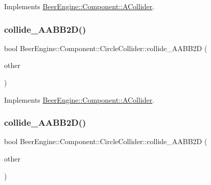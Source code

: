 Implements \mbox{\hyperlink{class_beer_engine_1_1_component_1_1_a_collider_ad9367c0e75c941509322fb984d16de00}{Beer\+Engine\+::\+Component\+::\+A\+Collider}}.

\mbox{\label{class_beer_engine_1_1_component_1_1_circle_collider_a20e45eaf7bb9ca22573e0fda117ae274}} 
\subsubsection{\texorpdfstring{collide\+\_\+\+A\+A\+B\+B2\+D()}{collide\_AABB2D()}\hspace{0.1cm}{\footnotesize\ttfamily [1/2]}}
{\footnotesize\ttfamily bool Beer\+Engine\+::\+Component\+::\+Circle\+Collider\+::collide\+\_\+\+A\+A\+B\+B2D (\begin{DoxyParamCaption}\item[{\mbox{\hyperlink{class_beer_engine_1_1_component_1_1_circle_collider}{Circle\+Collider}} $\ast$}]{other }\end{DoxyParamCaption})\hspace{0.3cm}{\ttfamily [virtual]}}



Implements \mbox{\hyperlink{class_beer_engine_1_1_component_1_1_a_collider_ab9acc12bf6017b81f3515264238ce3d5}{Beer\+Engine\+::\+Component\+::\+A\+Collider}}.

\mbox{\label{class_beer_engine_1_1_component_1_1_circle_collider_a9e88d5908734005d0141a75b8b02fd78}} 
\subsubsection{\texorpdfstring{collide\+\_\+\+A\+A\+B\+B2\+D()}{collide\_AABB2D()}\hspace{0.1cm}{\footnotesize\ttfamily [2/2]}}
{\footnotesize\ttfamily bool Beer\+Engine\+::\+Component\+::\+Circle\+Collider\+::collide\+\_\+\+A\+A\+B\+B2D (\begin{DoxyParamCaption}\item[{\mbox{\hyperlink{class_beer_engine_1_1_component_1_1_box_collider2_d}{Box\+Collider2D}} $\ast$}]{other }\end{DoxyParamCaption})\hspace{0.3cm}{\ttfamily [virtual]}}



